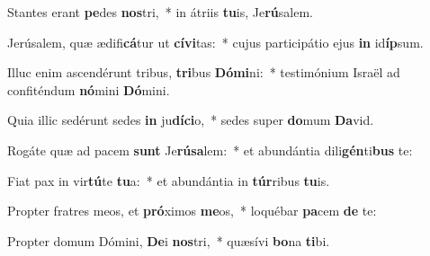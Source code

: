 \item Stantes erant \textbf{pe}des \textbf{nos}tri,~* in átriis \textbf{tu}is, Je\textbf{rú}salem.
\item Jerúsalem, quæ ædifi\textbf{cá}tur ut \textbf{cí}\textbf{vi}tas:~* cujus participátio ejus \textbf{in} id\textbf{íp}sum.
\item Illuc enim ascendérunt tribus, \textbf{tri}bus \textbf{Dó}\textbf{mi}ni:~* testimónium Israël ad confiténdum \textbf{nó}mini \textbf{Dó}mini.
\item Quia illic sedérunt sedes \textbf{in} ju\textbf{dí}\textbf{ci}o,~* sedes super \textbf{do}mum \textbf{Da}vid.
\item Rogáte quæ ad pacem \textbf{sunt} Je\textbf{rú}\textbf{sa}lem:~* et abundántia dili\textbf{gén}ti\textbf{bus} te:
\item Fiat pax in vir\textbf{tú}te \textbf{tu}a:~* et abundántia in \textbf{túr}ribus \textbf{tu}is.
\item Propter fratres meos, et \textbf{pró}ximos \textbf{me}os,~* loquébar \textbf{pa}cem \textbf{de} te:
\item Propter domum Dómini, \textbf{De}i \textbf{nos}tri,~* quæsívi \textbf{bo}na \textbf{ti}bi.
